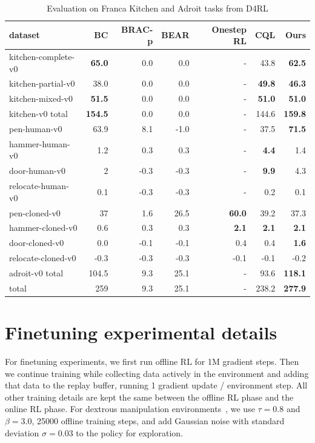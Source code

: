 \documentclass{article} %
\begin{document}
\begin{table}[!htp]\centering
\caption{Evaluation on Franca Kitchen and Adroit tasks from D4RL}\label{tab:franca_adroit}
\scriptsize
\begin{tabular}{l||rrrrr|r}
dataset &BC &BRAC-p &BEAR &Onestep RL &CQL &Ours \\ \hline
kitchen-complete-v0 &\textbf{65.0} &0.0 &0.0 &- &43.8 &\textbf{62.5} \\
kitchen-partial-v0 &38.0 &0.0 &0.0 &- &\textbf{49.8} &\textbf{46.3} \\
kitchen-mixed-v0 &\textbf{51.5} &0.0 &0.0 &- &\textbf{51.0} &\textbf{51.0} \\ \hline
kitchen-v0 total &\textbf{154.5} &0.0 &0.0 &- &144.6 &\textbf{159.8} \\ \hline
pen-human-v0 &63.9 &8.1 &-1.0 &- &37.5 &\textbf{71.5} \\
hammer-human-v0 &1.2 &0.3 &0.3 &- &\textbf{4.4} &1.4 \\
door-human-v0 &2 &-0.3 &-0.3 &- &\textbf{9.9} &4.3 \\
relocate-human-v0 &0.1 &-0.3 &-0.3 &- &0.2 &0.1 \\
pen-cloned-v0 &37 &1.6 &26.5 &\textbf{60.0} &39.2 &37.3 \\
hammer-cloned-v0 &0.6 &0.3 &0.3 &\textbf{2.1} &\textbf{2.1} &\textbf{2.1} \\
door-cloned-v0 &0.0 &-0.1 &-0.1 &0.4 &0.4 &\textbf{1.6} \\
relocate-cloned-v0 &-0.3 &-0.3 &-0.3 &-0.1 &-0.1 &-0.2 \\ \hline
adroit-v0 total &104.5 &9.3 &25.1 &- &93.6 &\textbf{118.1} \\ \hline \hline
total &259 &9.3 &25.1 &- &238.2 &\textbf{277.9} \\
\end{tabular}
\end{table}

\section{Finetuning experimental details}
\label{app:finetuning}
For finetuning experiments, we first run offline RL for 1M gradient steps. Then we continue training while collecting data actively in the environment and adding that data to the replay buffer, running 1 gradient update / environment step. All other training details are kept the same between the offline RL phase and the online RL phase. For dextrous manipulation environments~\citep{rajeswaran2018dextrous}, we use $\tau=0.8$ and $\beta=3.0$, 25000 offline training steps, and add Gaussian noise with standard deviation $\sigma=0.03$ to the policy for exploration.
\end{document}

